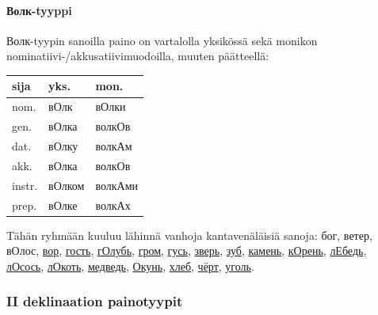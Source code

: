 \documentclass[]{scrartcl}
\begin{document}
\paragraph{Волк-tyyppi}\label{ux432ux43eux43bux43a-tyyppi}

Волк-tyypin sanoilla paino on vartalolla yksikössä sekä monikon
nominatiivi-/akkusatiivimuodoilla, muuten päätteellä:

\begin{longtable}[c]{@{}lll@{}}
\toprule
sija & yks. & mon.\tabularnewline
\midrule
\endhead
nom. & вОлк & вОлки\tabularnewline
gen. & вОлка & волкОв\tabularnewline
dat. & вОлку & волкАм\tabularnewline
akk. & вОлка & волкОв\tabularnewline
instr. & вОлком & волкАми\tabularnewline
prep. & вОлке & волкАх\tabularnewline
\bottomrule
\end{longtable}

Tähän ryhmään kuuluu lähinnä vanhoja kantavenäläisiä sanoja: бог, ветер,
вОлос,
\href{http://ru.wiktionary.org/wiki/\%D0\%B2\%D0\%BE\%D1\%80}{вор},
\href{http://ru.wiktionary.org/wiki/\%D0\%B3\%D0\%BE\%D1\%81\%D1\%82\%D1\%8C}{гость},
\href{http://ru.wiktionary.org/wiki/\%D0\%B3\%D0\%BE\%D0\%BB\%D1\%83\%D0\%B1\%D1\%8C}{гОлубь},
\href{http://ru.wiktionary.org/wiki/\%D0\%B3\%D1\%80\%D0\%BE\%D0\%BC}{гром},
\href{http://ru.wiktionary.org/wiki/\%D0\%B3\%D1\%83\%D1\%81\%D1\%8C}{гусь},
\href{http://ru.wiktionary.org/wiki/\%D0\%B7\%D0\%B2\%D0\%B5\%D1\%80\%D1\%8C}{зверь},
\href{http://ru.wiktionary.org/wiki/\%D0\%B7\%D1\%83\%D0\%B1}{зуб},
\href{http://ru.wiktionary.org/wiki/\%D0\%BA\%D0\%B0\%D0\%BC\%D0\%B5\%D0\%BD\%D1\%8C}{камень},
\href{http://ru.wiktionary.org/wiki/\%D0\%BA\%D0\%BE\%D1\%80\%D0\%B5\%D0\%BD\%D1\%8C}{кОрень},
\href{http://ru.wiktionary.org/wiki/\%D0\%BB\%D0\%B5\%D0\%B1\%D0\%B5\%D0\%B4\%D1\%8C}{лЕбедь},
\href{http://ru.wiktionary.org/wiki/\%D0\%BB\%D0\%BE\%D1\%81\%D0\%BE\%D1\%81\%D1\%8C}{лОсось},
\href{http://ru.wiktionary.org/wiki/\%D0\%BB\%D0\%BE\%D0\%BA\%D0\%BE\%D1\%82\%D1\%8C}{лОкоть},
\href{http://ru.wiktionary.org/wiki/\%D0\%BC\%D0\%B5\%D0\%B4\%D0\%B2\%D0\%B5\%D0\%B4\%D1\%8C}{медведь},
\href{http://ru.wiktionary.org/wiki/\%D0\%BE\%D0\%BA\%D1\%83\%D0\%BD\%D1\%8C}{Окунь},
\href{http://ru.wiktionary.org/wiki/\%D1\%85\%D0\%BB\%D0\%B5\%D0\%B1}{хлеб},
\href{http://ru.wiktionary.org/wiki/\%D1\%87\%D1\%91\%D1\%80\%D1\%82}{чёрт},
\href{http://ru.wiktionary.org/wiki/\%D1\%83\%D0\%B3\%D0\%BE\%D0\%BB\%D1\%8C}{уголь}.

\subsubsection{II deklinaation
painotyypit}\label{ii-deklinaation-painotyypit}
\end{document}
